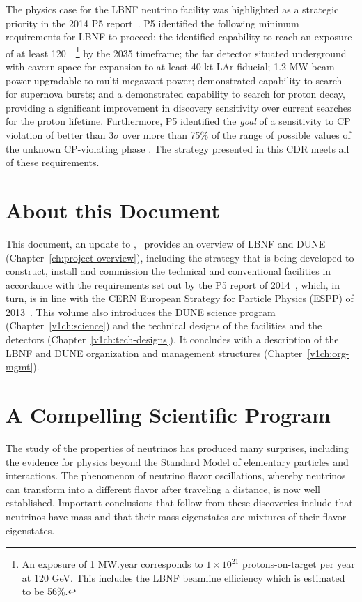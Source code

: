 The physics case for the LBNF neutrino facility was highlighted as a strategic priority in the 2014 P5 report~\cite{p5report2014}.
P5 identified the following minimum requirements for LBNF to proceed: 
the identified capability to reach an exposure of at least 120~\ktMWyr{}~\footnote{An exposure
of 1 MW.year corresponds to $1\times 10^{21}$ protons-on-target per year at 120 GeV. This includes the LBNF beamline efficiency which is estimated to be 56\%.}  by the 2035 timeframe;
the far detector situated underground with cavern space for expansion to at least 40-kt LAr fiducial;
1.2-MW beam power upgradable to multi-megawatt power;
demonstrated capability to search for supernova bursts; and
a demonstrated capability to search for proton decay, 
providing a significant improvement in discovery sensitivity over current searches for the proton lifetime.
Furthermore, P5 identified  the \textit{goal} of a sensitivity to CP violation of better than 3$\sigma$ over more than 75\% 
of the range of possible values of the unknown CP-violating phase \deltacp.
The strategy presented in this CDR meets all of these requirements.


\section{About this Document}

This document, an update to \volintro,~\cite{lbnecdr} provides an overview of LBNF and
DUNE (Chapter~\ref{ch:project-overview}), including the strategy that is being developed to construct, install and commission the technical and conventional facilities in accordance with the requirements set out by the P5 report of 2014~\cite{p5report2014}, which, in turn, is in line with the CERN
European Strategy for Particle Physics (ESPP) of 2013~\cite{ESPP-2012}. This volume also introduces the DUNE science program (Chapter~\ref{v1ch:science}) and the technical designs of the facilities and the detectors 
(Chapter~\ref{v1ch:tech-designs}). It concludes with a description of the LBNF and DUNE organization and management structures (Chapter~\ref{v1ch:org-mgmt}).



\section{A Compelling Scientific Program}

The study of the properties of neutrinos has produced 
many surprises, including the evidence for physics beyond the Standard Model of elementary particles and interactions.   The phenomenon of neutrino flavor oscillations, whereby 
neutrinos can transform into a different flavor after traveling a distance, 
is now well established. Important conclusions that follow from these discoveries include that neutrinos have mass and that their 
mass eigenstates are mixtures of their  
flavor eigenstates.

